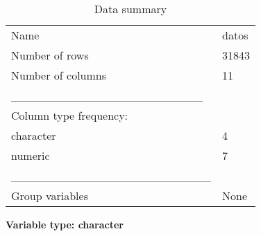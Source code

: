 \documentclass[
]{article}
\begin{document}
\begin{longtable}[]{@{}ll@{}}
\caption{Data summary}\tabularnewline
\toprule\noalign{}
\endfirsthead
\endhead
\bottomrule\noalign{}
\endlastfoot
Name & datos \\
Number of rows & 31843 \\
Number of columns & 11 \\
\_\_\_\_\_\_\_\_\_\_\_\_\_\_\_\_\_\_\_\_\_\_\_ & \\
Column type frequency: & \\
character & 4 \\
numeric & 7 \\
\_\_\_\_\_\_\_\_\_\_\_\_\_\_\_\_\_\_\_\_\_\_\_\_ & \\
Group variables & None \\
\end{longtable}

\textbf{Variable type: character}
\end{document}
